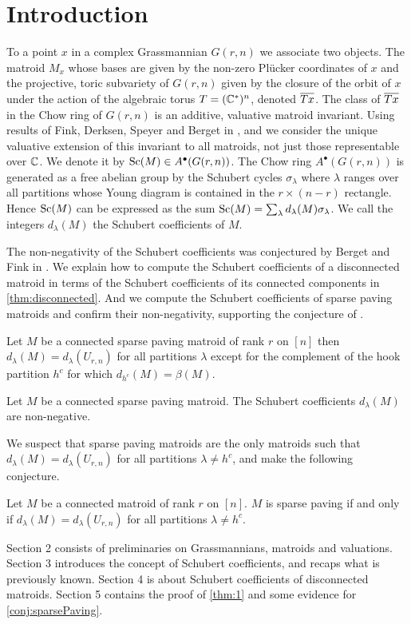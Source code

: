 \section{Introduction}

To a point $x$ in a complex Grassmannian $G(r,n)$ we associate two objects. The matroid $M_x$ whose bases are given by the non-zero Plücker coordinates of $x$ and the projective, toric subvariety of $G(r,n)$ given by the closure of the orbit of $x$ under the action of the algebraic torus $T= ({\mathbb C}^*)^n$, denoted ${\overline{Tx}}$. The class of ${\overline{Tx}}$ in the Chow ring of $G(r,n)$ is an additive, valuative matroid invariant. Using results of Fink, Derksen, Speyer and Berget in \cite{DerksenFink}, \cite{FinkSpeyer} and \cite{BergetFink} we consider the unique valuative extension of this invariant to all matroids, not just those representable over ${\mathbb C}$. We denote it by $\operatorname{\mathrm{Sc}}(M) \in A^\bullet(G(r,n))$. The Chow ring $A^\bullet(G(r,n))$ is generated as a free abelian group by the Schubert cycles $\sigma_\lambda$ where $\lambda$ ranges over all partitions whose Young diagram is contained in the $r\times (n-r)$ rectangle. Hence $\operatorname{\mathrm{Sc}}(M)$ can be expressed as the sum $\operatorname{\mathrm{Sc}}(M) = \sum_\lambda d_\lambda(M) \sigma_\lambda$. We call the integers $d_\lambda(M)$ the Schubert coefficients of $M$.

The non-negativity of the Schubert coefficients was conjectured by Berget and Fink in \cite{BergetFink}. We explain how to compute the Schubert coefficients of a disconnected matroid in terms of the Schubert coefficients of its connected components in \cref{thm:disconnected}. And we compute the Schubert coefficients of sparse paving matroids and confirm their non-negativity, supporting the conjecture of \cite{BergetFink}.
\begin{thm}
    \label{thm:1}
    Let $M$ be a connected sparse paving matroid of rank $r$ on $[n]$ then $d_\lambda(M) = d_\lambda(U_{r,n})$ for all partitions $\lambda$ except for the complement of the hook partition $h^c$ for which $d_{h^c}(M) = \beta(M)$.
\end{thm}
\begin{corollary}
    \label{cor:1}
    Let $M$ be a connected sparse paving matroid. The Schubert coefficients $d_\lambda(M)$ are non-negative.
\end{corollary}
We suspect that sparse paving matroids are the only matroids such that $d_\lambda(M) = d_\lambda(U_{r,n})$ for all partitions $\lambda \neq h^c$, and make the following conjecture.
\begin{conj}
    \label{conj:sparsePaving}
    Let $M$ be a connected matroid of rank $r$ on $[n]$. $M$ is sparse paving if and only if $d_\lambda(M) = d_\lambda(U_{r,n})$ for all partitions $\lambda \neq h^c$.
\end{conj}

Section 2 consists of preliminaries on Grassmannians, matroids and valuations. Section 3 introduces the concept of Schubert coefficients, and recaps what is previously known. Section 4 is about Schubert coefficients of disconnected matroids. Section 5 contains the proof of \cref{thm:1} and some evidence for \cref{conj:sparsePaving}.